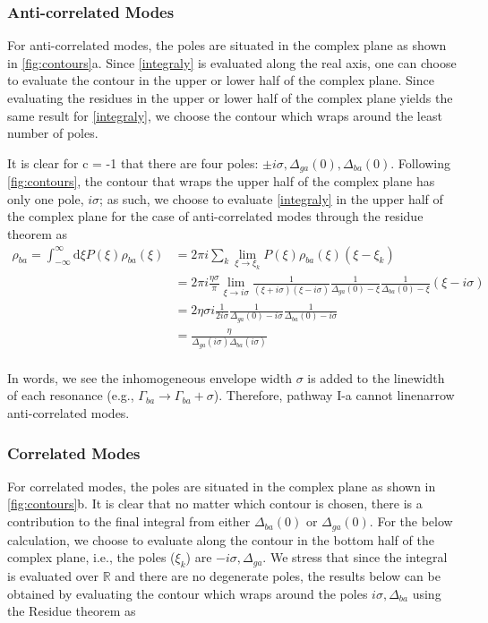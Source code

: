 \documentclass[aip, jcp, reprint, onecolumn]{revtex4-2}
\begin{document}
\begin{widetext}
\subsubsection{Anti-correlated Modes}
For anti-correlated modes, the poles are situated in the complex plane as shown in \autoref{fig:contours}a.
Since \autoref{integraly} is evaluated along the real axis, one can choose to evaluate the contour in the upper or lower half of the complex plane.
Since evaluating the residues in the upper or lower half of the complex plane yields the same result for \autoref{integraly}, we choose the contour which wraps around the least number of poles.

It is clear for c = -1 that there are four poles: $\pm i \sigma, \Delta_{ga}(0), \Delta_{ba}(0)$. 
Following \autoref{fig:contours}, the contour that wraps the upper half of the complex plane has only one pole, $i \sigma$; as such, we choose to evaluate \autoref{integraly} in the upper half of the complex plane for the case of anti-correlated modes through the residue theorem as
	\begin{equation}
		\begin{split}
			\rho_{ba} = \int_{-\infty}^\infty \mathrm{d}\xi P(\xi) \rho_{ba}(\xi) &= 2\pi i \sum_k \lim_{\xi \rightarrow \xi_k} P(\xi) \rho_{ba}(\xi) (\xi - \xi_k)\\
			&= 2\pi i \frac{\eta \sigma}{\pi} \lim_{\xi \rightarrow i\sigma} \frac{1}{(\xi + i\sigma)(\xi - i\sigma)} \frac{1}{\Delta_{ga}(0) - \xi} \frac{1}{\Delta_{ba}(0) - \xi} (\xi - i \sigma)\\
			&= 2\eta \sigma i \frac{1}{2i\sigma} \frac{1}{\Delta_{ga}(0) - i\sigma} \frac{1}{\Delta_{ba}(0) - i\sigma}\\
			&= \frac{\eta}{\Delta_{ga}(i\sigma)\Delta_{ba}(i \sigma)}\\
		\end{split}
	\end{equation}


In words, we see the inhomogeneous envelope width $\sigma$ is added to the linewidth of each resonance (e.g., $\Gamma_{ba} \rightarrow \Gamma_{ba} + \sigma$).
Therefore, pathway I-a cannot linenarrow anti-correlated modes. 
\subsubsection{Correlated Modes}
For correlated modes, the poles are situated in the complex plane as shown in \autoref{fig:contours}b.
It is clear that no matter which contour is chosen, there is a contribution to the final integral from either $\Delta_{ba}(0)$ or $\Delta_{ga}(0)$. 
For the below calculation, we choose to evaluate along the contour in the bottom half of the complex plane, i.e., the poles ($\xi_k$) are $-i\sigma, \Delta_{ga}$.
We stress that since the integral is evaluated over $\mathbb{R}$ and there are no degenerate poles, the results below can be obtained by evaluating the contour which wraps around the poles $i\sigma, \Delta_{ba}$ using the Residue theorem as 


\end{widetext}
\end{document}
